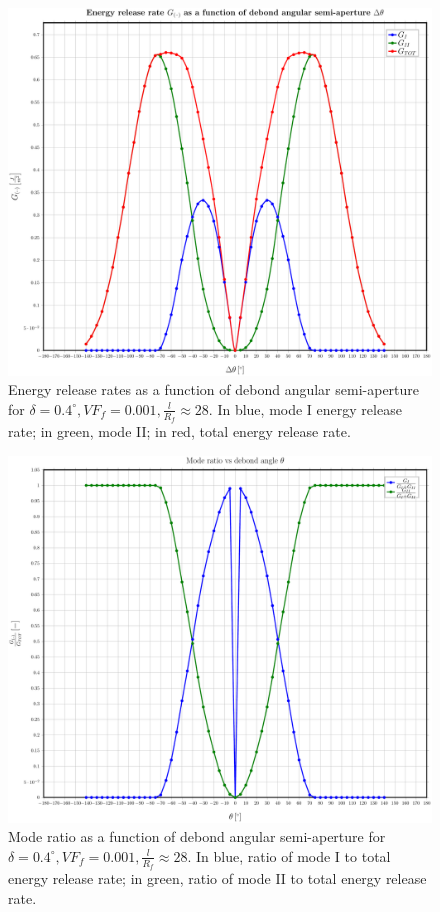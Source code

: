 \documentclass[a4paper]{jpconf}
\begin{document}
\begin{figure}[H]
\centering
 \includegraphics[height=0.45\textheight]{2017-03-03_AbqRunSummary_Gs.pdf}
 \caption{Energy release rates as a function of debond angular semi-aperture for $\delta=0.4^{\circ},VF_{f}=0.001,\frac{l}{R_{f}}\approx28$. In blue, mode I energy release rate; in green, mode II; in red, total energy release rate.}
\label{fig:enrrts}
\end{figure}

\begin{figure}[H]
\centering
 \includegraphics[height=0.45\textheight]{2017-03-03_AbqRunSummary_modeRatios.pdf}
 \caption{Mode ratio as a function of debond angular semi-aperture for $\delta=0.4^{\circ},VF_{f}=0.001,\frac{l}{R_{f}}\approx28$. In blue, ratio of mode I to total energy release rate; in green, ratio of mode II to total energy release rate.}
\label{fig:moderatios}
\end{figure}
\end{document}
